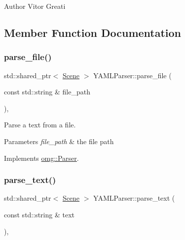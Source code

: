 \begin{DoxyAuthor}{Author}
Vitor Greati 
\end{DoxyAuthor}


\subsection{Member Function Documentation}
\mbox{\label{classomg_1_1_y_a_m_l_parser_ab569d1029cec7dc2cb91eb0e08f5bc37}} 
\subsubsection{\texorpdfstring{parse\_file()}{parse\_file()}}
{\footnotesize\ttfamily std\+::shared\+\_\+ptr$<$ \mbox{\hyperlink{classomg_1_1_scene}{Scene}} $>$ Y\+A\+M\+L\+Parser\+::parse\+\_\+file (\begin{DoxyParamCaption}\item[{const std\+::string \&}]{file\+\_\+path }\end{DoxyParamCaption})\hspace{0.3cm}{\ttfamily [override]}, {\ttfamily [virtual]}}



Parse a text from a file. 


\begin{DoxyParams}{Parameters}
{\em file\+\_\+path} & the file path \\
\hline
\end{DoxyParams}


Implements \mbox{\hyperlink{classomg_1_1_parser_a327a60ea0092d0b969a3ec393248ca8f}{omg\+::\+Parser}}.

\mbox{\label{classomg_1_1_y_a_m_l_parser_a646b059fb458cbd5b9bc3a29c1f777f4}} 
\subsubsection{\texorpdfstring{parse\_text()}{parse\_text()}}
{\footnotesize\ttfamily std\+::shared\+\_\+ptr$<$ \mbox{\hyperlink{classomg_1_1_scene}{Scene}} $>$ Y\+A\+M\+L\+Parser\+::parse\+\_\+text (\begin{DoxyParamCaption}\item[{const std\+::string \&}]{text }\end{DoxyParamCaption})\hspace{0.3cm}{\ttfamily [override]}, {\ttfamily [virtual]}}



